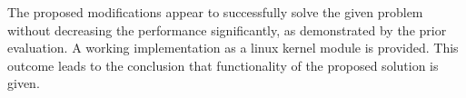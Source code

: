 The proposed modifications appear to successfully solve the given problem without decreasing the performance significantly, as demonstrated by the prior evaluation.
A working implementation as a linux kernel module is provided.
This outcome leads to the conclusion that functionality of the proposed solution is given.
